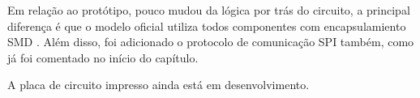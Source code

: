 \documentclass[../poliXuniversity_hospital_-USP-report.tex]{subfiles}
\begin{document}
Em relação ao protótipo, pouco mudou da lógica por trás do circuito, a principal diferença é que o modelo oficial utiliza todos componentes com encapsulamiento SMD \cite{SMD_def}. Além disso, foi adicionado o protocolo de comunicação SPI também, como já foi comentado no início do capítulo.


A placa de circuito impresso ainda está em desenvolvimento.

\end{document}
